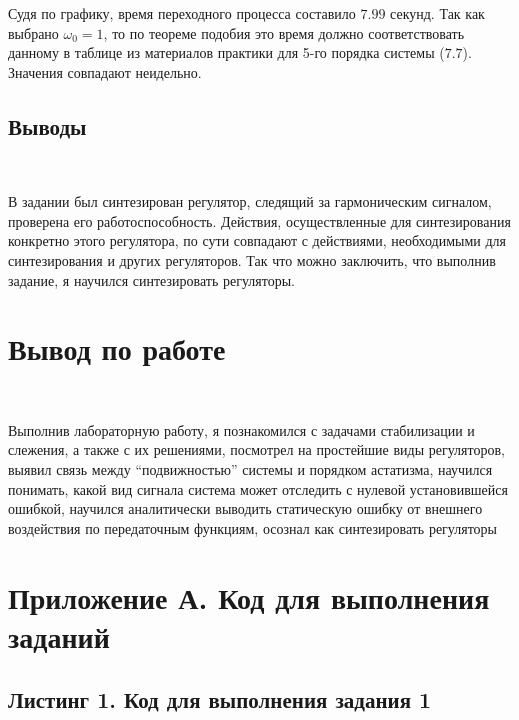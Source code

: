 \documentclass[a4paper]{article}
\begin{document}
Судя по графику, время переходного процесса составило $7.99$ секунд. Так как выбрано $\omega_0 = 1$, то по теореме подобия это время должно соответствовать данному в таблице из материалов практики для 5-го порядка системы ($7.7$). Значения совпадают неидельно.

\subsection{Выводы}\

В задании был синтезирован регулятор, следящий за гармоническим сигналом, проверена его работоспособность. Действия, осуществленные для синтезирования конкретно этого регулятора, по сути совпадают с действиями, необходимыми для синтезирования и других регуляторов. Так что можно заключить, что выполнив задание, я научился синтезировать регуляторы.

\section{Вывод по работе}\ 

Выполнив лабораторную работу, я познакомился с задачами стабилизации и слежения, а также с их решениями, посмотрел на простейшие виды регуляторов, выявил связь между ``подвижностью'' системы и порядком астатизма, научился понимать, какой вид сигнала система может отследить с нулевой установившейся ошибкой, научился аналитически выводить статическую ошибку от внешнего воздействия по передаточным функциям, осознал как синтезировать регуляторы 

\section{Приложение А. Код для выполнения заданий}

\subsection*{Листинг 1. Код для выполнения задания 1}
\end{document}
